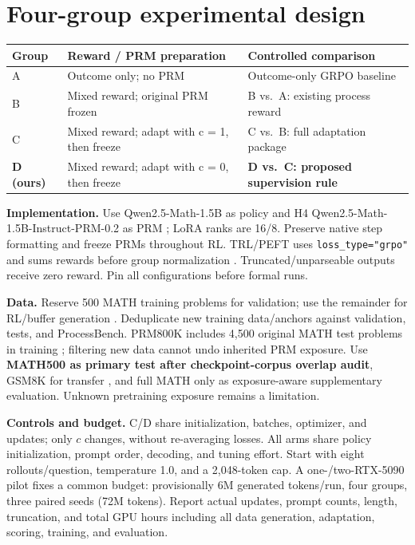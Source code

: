 \documentclass{article}
\begin{document}
\section{Four-group experimental design}
\begin{center}
\small
\renewcommand{\arraystretch}{1.12}
\begin{tabularx}{\linewidth}{@{}l L L@{}}
\toprule
\textbf{Group} & \textbf{Reward / PRM preparation} & \textbf{Controlled comparison} \\
\midrule
A & Outcome only; no PRM & Outcome-only GRPO baseline \\
B & Mixed reward; original PRM frozen & B vs.\ A: existing process reward \\
C & Mixed reward; adapt with c = 1, then freeze & C vs.\ B: full adaptation package \\
\textbf{D (ours)} & Mixed reward; adapt with c = 0, then freeze & \textbf{D vs.\ C: proposed supervision rule} \\
\bottomrule
\end{tabularx}
\end{center}
\textbf{Implementation.} Use Qwen2.5-Math-1.5B as policy and H4 Qwen2.5-Math-1.5B-Instruct-PRM-0.2 as PRM \citep{h4prm}; LoRA ranks are 16/8. Preserve native step formatting and freeze PRMs throughout RL. TRL/PEFT uses \texttt{loss\_type="grpo"} and sums rewards before group normalization \citep{trl}. Truncated/unparseable outputs receive zero reward. Pin all configurations before formal runs.

\textbf{Data.} Reserve 500 MATH training problems for validation; use the remainder for RL/buffer generation \citep{hendrycks2021}. Deduplicate new training data/anchors against validation, tests, and ProcessBench. PRM800K includes 4,500 original MATH test problems in training \citep{prmdata}; filtering new data cannot undo inherited PRM exposure. Use \textbf{MATH500 as primary test after checkpoint-corpus overlap audit}, GSM8K for transfer \citep{cobbe2021}, and full MATH only as exposure-aware supplementary evaluation. Unknown pretraining exposure remains a limitation.

\textbf{Controls and budget.} C/D share initialization, batches, optimizer, and updates; only $c$ changes, without re-averaging losses. All arms share policy initialization, prompt order, decoding, and tuning effort. Start with eight rollouts/question, temperature 1.0, and a 2,048-token cap. A one-/two-RTX-5090 pilot fixes a common budget: provisionally 6M generated tokens/run, four groups, three paired seeds (72M tokens). Report actual updates, prompt counts, length, truncation, and total GPU hours including all data generation, adaptation, scoring, training, and evaluation.
\end{document}
